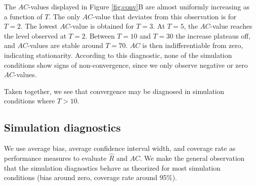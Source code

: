 \documentclass[article]{jss}
\begin{document}
The $AC$-values displayed in Figure \ref{fig:conv}B are almost uniformly increasing as a function of $T$. The only $AC$-value that deviates from this observation is for $T=2$. The lowest $AC$-value is obtained for $T=3$. At $T=5$, the $AC$-value reaches the level observed at $T=2$. Between $T=10$ and $T=30$ the increase plateaus off, and $AC$-values are stable around $T=70$. $AC$ is then indifferentiable from zero, indicating stationarity. %
According to this diagnostic, none of the simulation conditions show signs of non-convergence, since we only observe negative or zero $AC$-values.



Taken together, we see that convergence may be diagnosed in simulation conditions where $T>10$.

\subsection{Simulation diagnostics}
We use average bias, average confidence interval width, and coverage rate as performance measures to evaluate $\widehat{R}$ and $AC$. We make the general observation that the simulation diagnostics behave as theorized for most simulation conditions (bias around zero, coverage rate around 95\%). 
\end{document}

